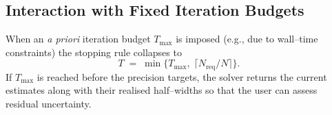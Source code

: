 \subsection{Interaction with Fixed Iteration Budgets}
\label{subsec:conv_budget}

When an \emph{a priori} iteration budget $T_{\max}$ is imposed (e.g., due to
wall--time constraints) the stopping rule collapses to
\begin{equation}
  T \;=\; \min\!\bigl\{T_{\max},\;\lceil N_{\text{req}}/N \rceil\bigr\}.
\end{equation}
If $T_{\max}$ is reached before the precision targets, the solver returns the
current estimates along with their realised half--widths so that the user can
assess residual uncertainty.

